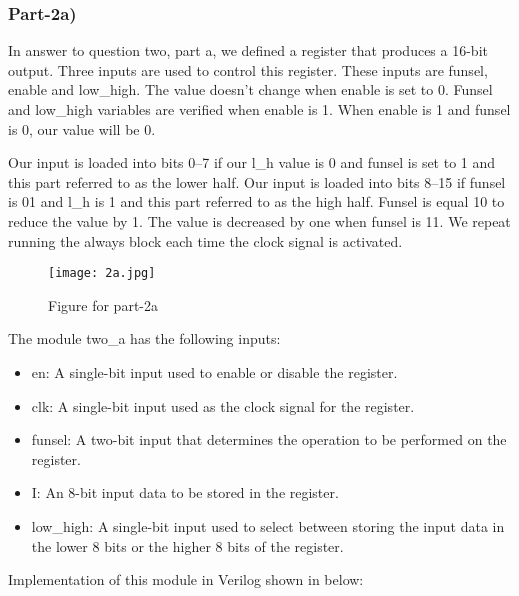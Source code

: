 \documentclass[12pt]{article}
\begin{document}
\subsubsection{Part-2a)}
In answer to question two, part a, we defined a register that produces a 16-bit output. Three inputs are used to control this register. These inputs are funsel, enable and low\_high. The value doesn't change when enable is set to 0. Funsel and low\_high variables are verified when enable is 1. When enable is 1 and funsel is 0, our value will be 0.

Our input is loaded into bits 0–7 if our l\_h value is 0 and funsel is set to 1 and this part referred to as the lower half. Our input is loaded into bits 8–15 if funsel is 01 and l\_h is 1 and this part referred to as the high half. Funsel is equal 10 to reduce the value by 1. The value is decreased by one when funsel is 11. We repeat running the always block each time the clock signal is activated.

\vspace{0.5cm}
\begin{figure}[H]
    \centering
    \texttt{[image: 2a.jpg]}
    \caption{Figure for part-2a}
    \label{fig:part2a}
\end{figure}

The module two\_a has the following inputs:
\begin{itemize}
    \item en: A single-bit input used to enable or disable the register.
    \item clk: A single-bit input used as the clock signal for the register.
    \item funsel: A two-bit input that determines the operation to be performed on the register.
    \item I: An 8-bit input data to be stored in the register.
    \item low\_high: A single-bit input used to select between storing the input data in the lower 8 bits or the higher 8 bits of the register.
\end{itemize}

\clearpage

Implementation of this module in Verilog shown in below:
 
\end{document}
